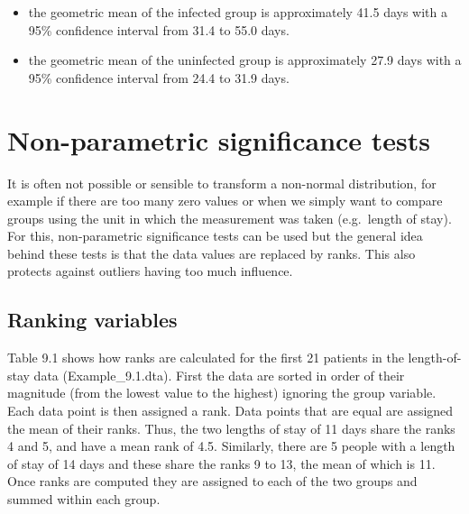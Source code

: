 \documentclass[
]{memoir}
\providecommand{\tightlist}{%
  \setlength{\itemsep}{0pt}\setlength{\parskip}{0pt}}
\begin{document}
\begin{itemize}
\tightlist
\item
  the geometric mean of the infected group is approximately 41.5 days with a 95\% confidence interval from 31.4 to 55.0 days.
\item
  the geometric mean of the uninfected group is approximately 27.9 days with a 95\% confidence interval from 24.4 to 31.9 days.
\end{itemize}

\hypertarget{non-parametric-significance-tests}{%
\section{Non-parametric significance tests}\label{non-parametric-significance-tests}}

It is often not possible or sensible to transform a non-normal distribution, for example if there are too many zero values or when we simply want to compare groups using the unit in which the measurement was taken (e.g.~length of stay). For this, non-parametric significance tests can be used but the general idea behind these tests is that the data values are replaced by ranks. This also protects against outliers having too much influence.

\hypertarget{ranking-variables}{%
\subsection{Ranking variables}\label{ranking-variables}}

Table 9.1 shows how ranks are calculated for the first 21 patients in the length-of-stay data (Example\_9.1.dta). First the data are sorted in order of their magnitude (from the lowest value to the highest) ignoring the group variable. Each data point is then assigned a rank. Data points that are equal are assigned the mean of their ranks. Thus, the two lengths of stay of 11 days share the ranks 4 and 5, and have a mean rank of 4.5. Similarly, there are 5 people with a length of stay of 14 days and these share the ranks 9 to 13, the mean of which is 11. Once ranks are computed they are assigned to each of the two groups and summed within each group.

 
  \providecommand{\huxb}[2]{\arrayrulecolor[RGB]{#1}\global\arrayrulewidth=#2pt}
  \providecommand{\huxvb}[2]{\color[RGB]{#1}\vrule width #2pt}
  \providecommand{\huxtpad}[1]{\rule{0pt}{#1}}
  \providecommand{\huxbpad}[1]{\rule[-#1]{0pt}{#1}}
\end{document}
